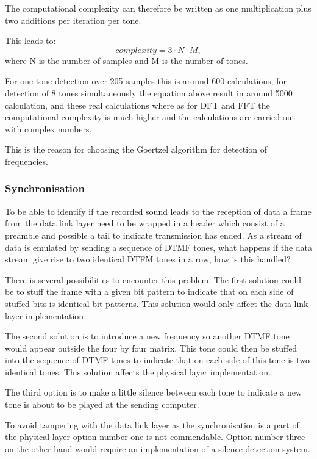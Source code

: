 		The computational complexity can therefore be written as one multiplication plus two additions per iteration per tone.

		This leads to:
		\begin{equation}complexity = 3\cdot N\cdot M,\end{equation}
		where N is the number of samples and M is the number of tones.
		
		For one tone detection over 205 samples this is around 600 calculations, for detection of 8 tones simultaneously the equation
		above result in around 5000 calculation, and these real calculations where as for DFT and FFT the computational complexity 
		is much higher and the calculations are carried out with complex numbers.
		
		This is the reason for choosing the Goertzel algorithm for detection of frequencies.
		
		\subsubsection{Synchronisation}
		To be able to identify if the recorded sound leads to the reception of data a frame from the data link
		layer need to be wrapped in a header which consist of a preamble and possible a tail to indicate transmission has ended.
		As a stream of data is emulated by sending a sequence of DTMF tones, what happens if the data stream give rise to two identical
		DTFM tones in a row, how is this handled? 
		
		There is several possibilities to encounter this problem. The first solution could be to stuff the frame with a given bit
		pattern to indicate that on each side of stuffed bits is identical bit patterns. This solution would only affect the data 
		link layer implementation.
		
		The second solution is to introduce a new frequency so another DTMF tone would appear outside the four by four matrix.
		This tone could then be stuffed into the sequence of DTMF tones to indicate that on each side of this tone is two identical
		tones. This solution affects the physical layer implementation.
		
		The third option is to make a little silence between each tone to indicate a new tone is about to be played at the sending computer.
		
		To avoid tampering with the data link layer as the synchronisation is a part of the physical layer option number one is not commendable. Option
		number three on the other hand would require an implementation of a silence detection system.
		
